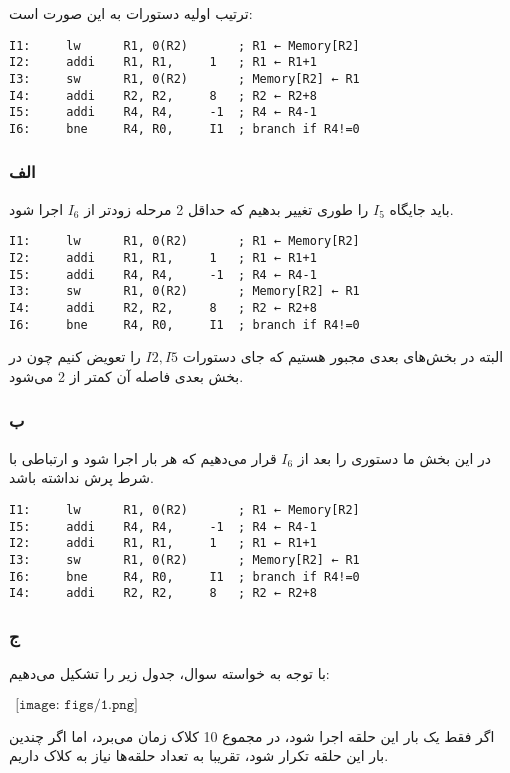 ترتیب اولیه دستورات به این صورت است:

\setLTR
\begin{lstlisting}
I1:     lw      R1, 0(R2)       ; R1 ← Memory[R2]
I2:     addi    R1, R1,     1   ; R1 ← R1+1
I3:     sw      R1, 0(R2)       ; Memory[R2] ← R1
I4:     addi    R2, R2,     8   ; R2 ← R2+8
I5:     addi    R4, R4,     -1  ; R4 ← R4-1
I6:     bne     R4, R0,     I1  ; branch if R4!=0
\end{lstlisting}
\setRTL

\subsubsection*{الف}
باید جایگاه
$I_5$
را طوری تغییر بدهیم که حداقل 2 مرحله زودتر از 
$I_6$
اجرا شود.

\setLTR
\begin{lstlisting}
I1:     lw      R1, 0(R2)       ; R1 ← Memory[R2]
I2:     addi    R1, R1,     1   ; R1 ← R1+1
I5:     addi    R4, R4,     -1  ; R4 ← R4-1
I3:     sw      R1, 0(R2)       ; Memory[R2] ← R1
I4:     addi    R2, R2,     8   ; R2 ← R2+8
I6:     bne     R4, R0,     I1  ; branch if R4!=0
\end{lstlisting}
\setRTL

البته در بخش‌های بعدی مجبور هستیم که جای دستورات 
$I2 , I5$
را تعویض کنیم چون در بخش بعدی فاصله آن کمتر از 2 می‌شود.

\subsubsection*{ب}
در این بخش ما دستوری را بعد از 
$I_6$
قرار می‌دهیم که هر بار اجرا شود و ارتباطی با شرط پرش نداشته باشد.

\setLTR
\begin{lstlisting}
I1:     lw      R1, 0(R2)       ; R1 ← Memory[R2]
I5:     addi    R4, R4,     -1  ; R4 ← R4-1
I2:     addi    R1, R1,     1   ; R1 ← R1+1
I3:     sw      R1, 0(R2)       ; Memory[R2] ← R1
I6:     bne     R4, R0,     I1  ; branch if R4!=0
I4:     addi    R2, R2,     8   ; R2 ← R2+8
\end{lstlisting}
\setRTL

\subsubsection*{ج}

با توجه به خواسته سوال، جدول زیر را تشکیل می‌دهیم:
\setLTR

$ \ \ \texttt{[image: figs/1.png]}$

\setRTL

اگر فقط یک بار این حلقه اجرا شود، در مجموع 10 کلاک زمان می‌برد، اما اگر چندین بار این حلقه تکرار شود، تقریبا به تعداد حلقه‌ها نیاز به کلاک داریم.



